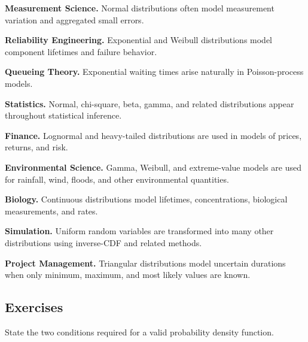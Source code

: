 \begin{applicationbox}

\textbf{Measurement Science.}
Normal distributions often model measurement variation and aggregated
small errors.

\medskip

\textbf{Reliability Engineering.}
Exponential and Weibull distributions model component lifetimes and
failure behavior.

\medskip

\textbf{Queueing Theory.}
Exponential waiting times arise naturally in Poisson-process models.

\medskip

\textbf{Statistics.}
Normal, chi-square, beta, gamma, and related distributions appear
throughout statistical inference.

\medskip

\textbf{Finance.}
Lognormal and heavy-tailed distributions are used in models of prices,
returns, and risk.

\medskip

\textbf{Environmental Science.}
Gamma, Weibull, and extreme-value models are used for rainfall,
wind, floods, and other environmental quantities.

\medskip

\textbf{Biology.}
Continuous distributions model lifetimes, concentrations, biological
measurements, and rates.

\medskip

\textbf{Simulation.}
Uniform random variables are transformed into many other distributions
using inverse-CDF and related methods.

\medskip

\textbf{Project Management.}
Triangular distributions model uncertain durations when only minimum,
maximum, and most likely values are known.

\end{applicationbox}

\subsection{Exercises}
\label{subsec:continuous-distributions-exercises}

\begin{exercise}[1]
State the two conditions required for a valid probability density
function.
\end{exercise}

